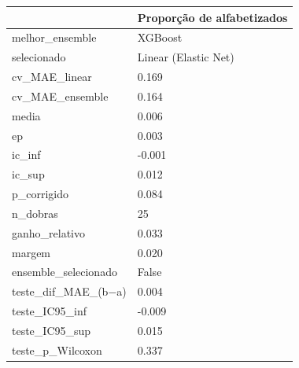 \begin{tabular}{ll}
\toprule
 & Proporção de alfabetizados \\
\midrule
melhor\_ensemble & XGBoost \\
selecionado & Linear (Elastic Net) \\
cv\_MAE\_linear & 0.169 \\
cv\_MAE\_ensemble & 0.164 \\
media & 0.006 \\
ep & 0.003 \\
ic\_inf & -0.001 \\
ic\_sup & 0.012 \\
p\_corrigido & 0.084 \\
n\_dobras & 25 \\
ganho\_relativo & 0.033 \\
margem & 0.020 \\
ensemble\_selecionado & False \\
teste\_dif\_MAE\_(b−a) & 0.004 \\
teste\_IC95\_inf & -0.009 \\
teste\_IC95\_sup & 0.015 \\
teste\_p\_Wilcoxon & 0.337 \\
\bottomrule
\end{tabular}
